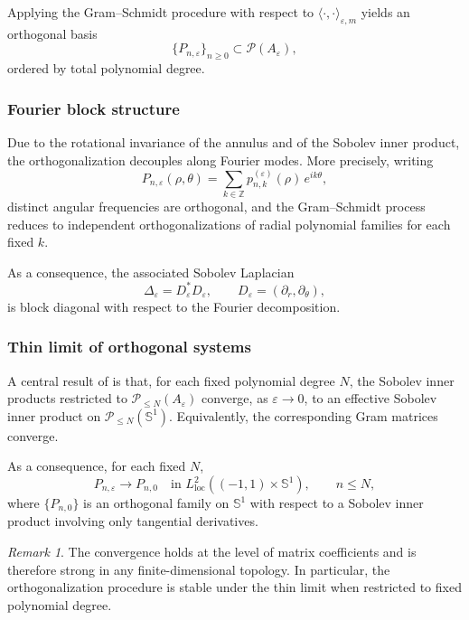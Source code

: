 \documentclass[11pt]{amsart}
\theoremstyle{plain}
\theoremstyle{definition}
\theoremstyle{remark}
\newtheorem{remark}[theorem]{Remark}
\theoremstyle{remark}
\begin{document}
Applying the Gram--Schmidt procedure with respect to
$\langle\cdot,\cdot\rangle_{\varepsilon,m}$ yields an orthogonal basis
\[
\bigl\{P_{n,\varepsilon}\bigr\}_{n\ge0}
\subset \mathcal P(A_\varepsilon),
\]
ordered by total polynomial degree.

\subsubsection{Fourier block structure}

Due to the rotational invariance of the annulus and of the Sobolev inner product,
the orthogonalization decouples along Fourier modes.
More precisely, writing
\[
P_{n,\varepsilon}(\rho,\theta)
=
\sum_{k\in\mathbb Z} p_{n,k}^{(\varepsilon)}(\rho)\,e^{ik\theta},
\]
distinct angular frequencies are orthogonal, and the Gram--Schmidt process
reduces to independent orthogonalizations of radial polynomial families
for each fixed $k$.

As a consequence, the associated Sobolev Laplacian
\[
\Delta_{\varepsilon} = D_\varepsilon^{*}D_\varepsilon,
\qquad
D_\varepsilon = (\partial_r,\partial_\theta),
\]
is block diagonal with respect to the Fourier decomposition.

\subsubsection{Thin limit of orthogonal systems}

A central result of \cite{MagnotThinAnnuli} is that, for each fixed polynomial
degree $N$, the Sobolev inner products restricted to
$\mathcal P_{\le N}(A_\varepsilon)$ converge, as $\varepsilon\to0$, to an
effective Sobolev inner product on $\mathcal P_{\le N}(\mathbb S^1)$.
Equivalently, the corresponding Gram matrices converge.

As a consequence, for each fixed $N$,
\[
P_{n,\varepsilon}
\longrightarrow
P_{n,0}
\quad\text{in }L^2_{\mathrm{loc}}((-1,1)\times\mathbb S^1),
\qquad n\le N,
\]
where $\{P_{n,0}\}$ is an orthogonal family on $\mathbb S^1$ with respect to
a Sobolev inner product involving only tangential derivatives.

\begin{remark}
The convergence holds at the level of matrix coefficients and is therefore
strong in any finite-dimensional topology.
In particular, the orthogonalization procedure is stable under the thin limit
when restricted to fixed polynomial degree.
\end{remark}
\end{document}
